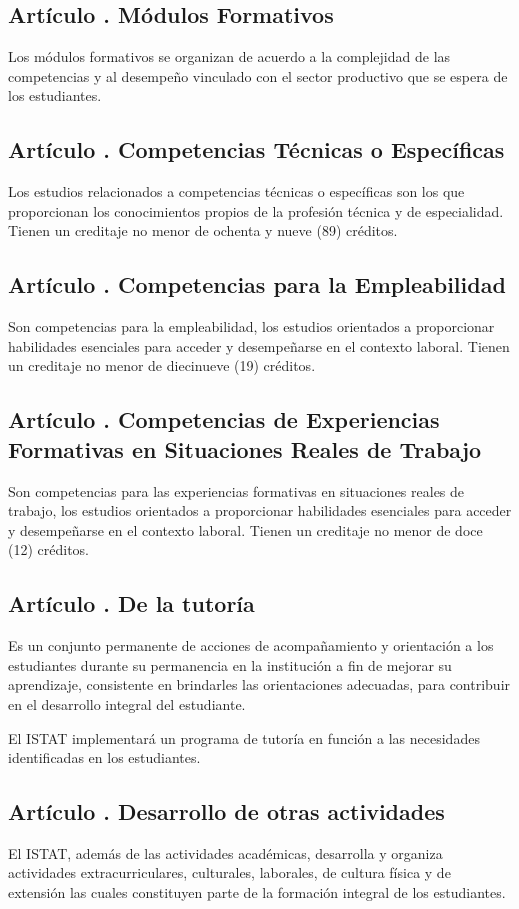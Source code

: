 \subsection{Artículo . Módulos Formativos}
\addtocounter{ns}{1}
Los módulos formativos se organizan de acuerdo a la complejidad de las competencias y al desempeño vinculado con el sector productivo que se espera de los estudiantes.
\subsection{Artículo . Competencias Técnicas o Específicas}
\addtocounter{ns}{1}
Los estudios relacionados a competencias técnicas o específicas son los que proporcionan los conocimientos propios de la profesión técnica y de especialidad. Tienen un creditaje no menor de ochenta y nueve (89) créditos. 
\subsection{Artículo . Competencias para la Empleabilidad}
\addtocounter{ns}{1}
Son competencias para la empleabilidad, los estudios orientados a proporcionar habilidades esenciales para acceder y desempeñarse en el contexto laboral. Tienen un creditaje no menor de diecinueve (19) créditos. 
\subsection{Artículo . Competencias de Experiencias Formativas en Situaciones Reales de Trabajo}
\addtocounter{ns}{1}
Son competencias para las experiencias formativas en situaciones reales de trabajo, los estudios orientados a proporcionar habilidades esenciales para acceder y desempeñarse en el contexto laboral. Tienen un creditaje no menor de doce (12) créditos. 
\subsection{Artículo . De la tutoría}
\addtocounter{ns}{1}
Es un conjunto permanente de acciones de acompañamiento y orientación a los estudiantes durante su permanencia en la institución a fin de mejorar su aprendizaje, consistente en brindarles las orientaciones adecuadas, para contribuir en el desarrollo integral del estudiante. 

El ISTAT implementará un programa de tutoría en función a las necesidades identificadas en los estudiantes.
\subsection{Artículo . Desarrollo de otras actividades}
\addtocounter{ns}{1}
El ISTAT, además de las actividades académicas, desarrolla y organiza actividades extracurriculares, culturales, laborales, de cultura física y de extensión las cuales constituyen parte de la formación integral de los estudiantes.

